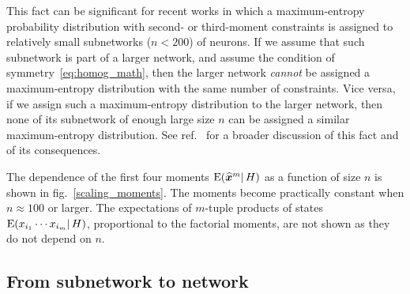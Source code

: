 \documentclass{article}
\newcommand*{\citep}{\parencites}
\theoremstyle{innote}
\newcommand*{\sav}{\widehat} %
\newcommand*{\yx}{\bm{x}}%
\newcommand*{\yxs}{\sav{\yx}}%
\newcommand*{\yH}{\varEta}
\newcommand*{\eg}{{e.g.}}
\newcommand*{\cond}%
{\mathpunct{|}}%
\renewcommand*{\|}{\cond}
\newcommand*{\+}{\lor}
\newcommand*{\fig}{fig.}%
\let\varEta H
\newcommand*{\E}{\mathrm{E}}
\DeclarePairedDelimiter\expp{(}{)}
\newcommand*{\expe}{\E\expp}%
\begin{document}
This fact can be significant for recent works
\citep[\eg,][]{schneidmanetal2006,shlensetal2006,tkaciketal2006,marreetal2009,tkaciketal2009,ganmoretal2011,shimazakietal2012,tkaciketal2013,shimazakietal2015}
in which a maximum-entropy probability distribution with second- or
third-moment constraints is assigned to relatively small subnetworks
($n < 200$) of neurons. If we assume that such subnetwork is part of a
larger network, and assume the condition of symmetry~\eqref{eq:homog_math},
then the larger network \emph{cannot} be assigned a maximum-entropy
distribution with the same number of constraints. Vice versa, if we assign
such a maximum-entropy distribution to the larger network, then none of its
subnetwork of enough large size $n$ can be assigned a similar
maximum-entropy distribution. See ref.~\citep{rostamietal2016} for a
broader discussion of this fact and of its consequences.

\medskip

The dependence of the first four moments $\expe{\yxs^m \cond \yH}$ as a
function of size $n$ is shown in \fig~\ref{scaling_moments}. The moments
become practically constant when $n \approx 100$ or larger. The
expectations of $m$-tuple products of states
$\expe{x_{i_1}\dotsm x_{i_m} \cond \yH}$, proportional to the factorial
moments, are not shown as they do not depend on $n$.


\subsection{From subnetwork to network}
\label{sec:from_sub_to_full}
\end{document}
